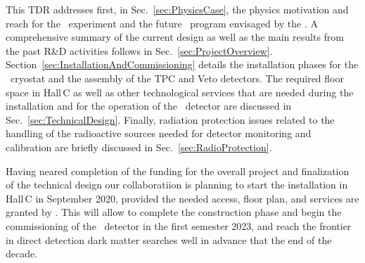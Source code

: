 This TDR addresses first, in Sec.~\ref{sec:PhysicsCase}, the physics motivation and reach for the \DSks\ experiment and the future \LAr\ program envisaged by the \GADMC.  A comprehensive summary of the current design as well as the main results from the past R\&D activities follows in Sec.~\ref{sec:ProjectOverview}. Section~\ref{sec:InstallationAndCommissioning} details the installation phases for the \AAr\ cryostat and the assembly of the TPC and Veto detectors. The required floor space in Hall\,C as well as other technological services that are needed during the installation and for the operation of the \DSks\ detector are discussed in Sec.~\ref{sec:TechnicalDesign}. Finally, radiation protection issues related to the handling of the radioactive sources needed for detector monitoring and calibration are briefly discussed in Sec.~\ref{sec:RadioProtection}. 

Having neared completion of the funding for the overall project and finalization of the technical design our collaboratiion is planning to start the installation in  Hall\,C in September 2020, provided the needed access, floor plan, and services are granted by \LNGS.  This will allow  to complete the construction phase and begin the commissioning of the \DSks\ detector in the first semester 2023, and reach the frontier in direct detection dark matter searches well in advance that the end of the decade.

